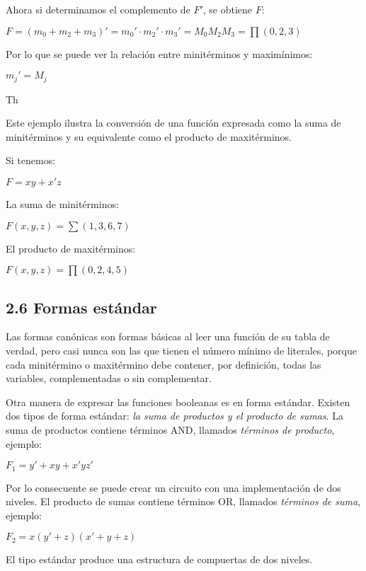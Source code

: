 \documentclass{article}
\begin{document}
\begin{flushleft}
    Ahora si determinamos el complemento de $F'$, se obtiene $F$:
\end{flushleft}
\begin{center}
    $F = (m_0 + m_2 + m_3)' = m_0' \cdot m_2' \cdot m_3' = M_0M_2M_3 = \prod(0, 2, 3)$
\end{center}

Por lo que se puede ver la relaci\'{o}n entre minit\'{e}rminos y maxim\'{i}nimos:
\begin{center}
    $m_j' = M_j$
\end{center}
Th

Este ejemplo ilustra la conversi\'{o}n de una funci\'{o}n expresada como la suma de minit\'{e}rminos
y su equivalente como el producto de maxit\'{e}rminos.

Si tenemos:
\begin{center}
    $F = xy + x'z$
\end{center}

\begin{flushleft}
    La suma de minit\'{e}rminos:
\end{flushleft}
\begin{center}
    $F(x, y, z) = \sum(1, 3, 6, 7)$
\end{center}
\begin{flushleft}
    El producto de maxit\'{e}rminos:
\end{flushleft}
\begin{center}
    $F(x, y, z) = \prod(0, 2, 4, 5)$
\end{center}
\newpage

\subsection*{2.6 Formas est\'{a}ndar}
Las formas can\'{o}nicas son formas b\'{a}sicas al leer una funci\'{o}n de su tabla de verdad,
pero casi nunca son las que tienen el n\'{u}mero m\'{i}nimo de literales, porque cada minit\'{e}rmino
o maxit\'{e}rmino debe contener, por definici\'{o}n, todas las variables, complementadas o sin complementar.

Otra manera de expresar las funciones booleanas es en forma est\'{a}ndar. Existen dos tipos de forma est\'{a}ndar:
\textit{la suma de productos y el producto de sumas}. La suma de productos contiene t\'{e}rminos AND, llamados
\textit{t\'{e}rminos de producto}, ejemplo:
\begin{center}
    $F_1 = y' + xy + x'yz'$
\end{center}
Por lo consecuente se puede crear un circuito con una implementaci\'{o}n de dos niveles. El producto de sumas contiene
t\'{e}rminos OR, llamados \textit{t\'{e}rminos de suma}, ejemplo:
\begin{center}
    $F_2 = x(y' + z)(x' + y + z)$
\end{center}
El tipo est\'{a}ndar produce una estructura de compuertas de dos niveles.
\end{document}
